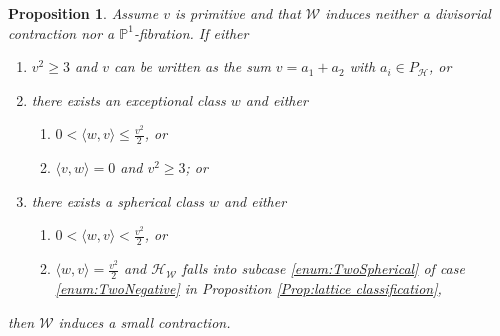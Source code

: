 \documentclass[leqno,11pt]{amsart}
\def\P{\ensuremath{\mathbb{P}}}
\newtheorem{Prop}[Thm]{Proposition}
\theoremstyle{definition}
\def\P{\ensuremath{\mathbb{P}}}
\def\HH{\ensuremath{\mathcal H}}
\def\WW{\ensuremath{\mathcal W}}
\begin{document}
\begin{Prop} \label{prop:flops}
Assume $v$ is primitive and that $\WW$ induces neither a divisorial contraction nor a $\P^1$-fibration.  If either
\begin{enumerate}
\item \label{enum:sum2positive}
$v^2\geq 3$ and $v$ can be written as the sum 
$v = a_1 + a_2$ with $a_i\in P_\HH$, or 
\item\label{enum:exceptional} there exists an exceptional class $w$ and either
\begin{enumerate}
\item\label{enum:exceptionalflop1}
$0< \langle  w,v\rangle\leq\frac{v^2}{2}$, or
\item\label{enum:exceptionalflop2}
$\langle v,w\rangle=0$ and $v^2\geq 3$; or
\end{enumerate}
\item\label{enum:spherical} there exists a spherical class $w$ and either
\begin{enumerate}
\item\label{enum:sphericalflop1}
$0 < \langle w, v\rangle < \frac{v^2}2$, or
\item\label{enum:sphericalflop2}
$\langle w,v\rangle=\frac{v^2}{2}$ and $\HH_{\WW}$ falls into subcase \ref{enum:TwoSpherical} of case \ref{enum:TwoNegative} in Proposition \ref{Prop:lattice classification},
\end{enumerate}
\end{enumerate}
then $\WW$ induces a small contraction.
\end{Prop}
\end{document}
